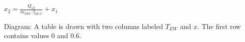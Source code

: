 \( x_2 = \frac{Q_{12}}{m_{EW} \cdot l_{00^\circ C}} + x_1 \)  

Diagram:  
A table is drawn with two columns labeled \( T_{EW} \) and \( x \). The first row contains values \( 0 \) and \( 0.6 \).